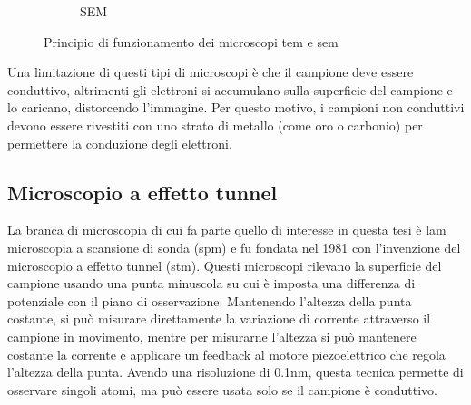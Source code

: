 \documentclass[../main.tex]{subfiles}
\begin{document}
\begin{figure}[h]
\begin{subfigure}[t]{5cm}
	\caption{SEM}
\end{subfigure}%
\caption[Principio di funzionamento dei microscopi TEM e SEM] {
	Principio di funzionamento dei microscopi \acrshort{tem} e \acrshort{sem} }
\label{fig:em_diag}
\end{figure}

Una limitazione di questi tipi di microscopi è che il campione deve essere conduttivo, altrimenti gli elettroni si accumulano sulla superficie del campione e lo caricano, distorcendo l'immagine. Per questo motivo, i campioni non conduttivi devono essere rivestiti con uno strato di metallo (come oro o carbonio) per permettere la conduzione degli elettroni.


\subsection{Microscopio a effetto tunnel}

La branca di microscopia di cui fa parte quello di interesse in questa tesi è lam microscopia a scansione di sonda (\acrshort{spm}) e fu fondata nel 1981 con l'invenzione del microscopio a effetto tunnel (\acrshort{stm}).\cite{ieee_spm}
Questi microscopi rilevano la superficie del campione usando una punta minuscola su cui è imposta una differenza di potenziale con il piano di osservazione. Mantenendo l'altezza della punta costante, si può misurare direttamente la variazione di corrente attraverso il campione in movimento, mentre per misurarne l'altezza si può mantenere costante la corrente e applicare un feedback al motore piezoelettrico che regola l'altezza della punta. Avendo una risoluzione di 0.1nm, questa tecnica permette di osservare singoli atomi, ma può essere usata solo se il campione è conduttivo.\cite{bai_2000}
\end{document}

